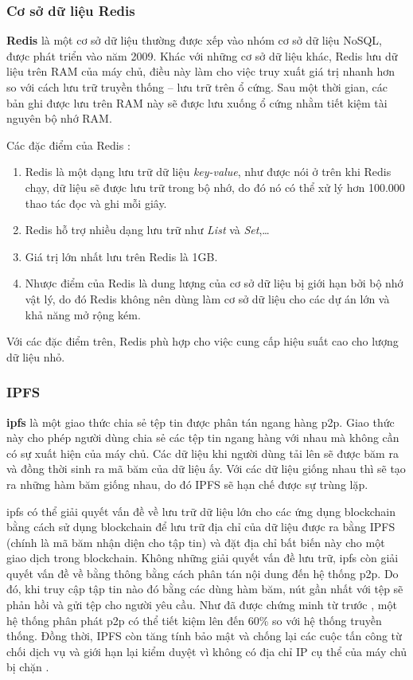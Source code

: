 \documentclass[../main-report.tex]{subfiles}
\begin{document}
\subsubsection{Cơ sở dữ liệu Redis}
\textbf{Redis} là một cơ sở dữ liệu thường được xếp vào nhóm cơ sở dữ liệu NoSQL, được phát triển vào năm 2009. Khác với những cơ sở dữ liệu khác, Redis lưu dữ liệu trên RAM của máy chủ, điều này làm cho việc truy xuất giá trị nhanh hơn so với cách lưu trữ truyền thống – lưu trữ trên ổ cứng. Sau một thời gian, các bản ghi được lưu trên RAM này sẽ được lưu xuống ổ cứng nhằm tiết kiệm tài nguyên bộ nhớ RAM.

Các đặc điểm của Redis \cite{6106531}:

\begin{enumerate}[label=(\roman*)]
\item Redis là một dạng lưu trữ dữ liệu \textit{key-value}, như được nói ở trên khi Redis chạy, dữ liệu sẽ được lưu trữ trong bộ nhớ, do đó nó có thể xử lý hơn 100.000 thao tác đọc và ghi mỗi giây.
\item Redis hỗ trợ nhiều dạng lưu trữ như \textit{List} và \textit{Set},\ldots
\item Giá trị lớn nhất lưu trên Redis là 1GB.
\item Nhược điểm của Redis là dung lượng của cơ sở dữ liệu bị giới hạn bởi bộ nhớ vật lý, do đó Redis không nên dùng làm cơ sở dữ liệu cho các dự án lớn và khả năng mở rộng kém.
\end{enumerate}

Với các đặc điểm trên, Redis phù hợp cho việc cung cấp hiệu suất cao cho lượng dữ liệu nhỏ.

\subsubsection{IPFS}
\textbf{\acrfull{ipfs}} là một giao thức chia sẻ tệp tin được phân tán ngang hàng \acrfull{p2p}. Giao thức này cho phép người dùng chia sẻ các tệp tin ngang hàng với nhau mà không cần có sự xuất hiện của máy chủ. Các dữ liệu khi người dùng tải lên sẽ được băm ra và đồng thời sinh ra mã băm của dữ liệu ấy. Với các dữ liệu giống nhau thì sẽ tạo ra những hàm băm giống nhau, do đó IPFS sẽ hạn chế được sự trùng lặp.
 
\acrshort{ipfs} có thể giải quyết vấn đề về lưu trữ dữ liệu lớn cho các ứng dụng \gls{blockchain} bằng cách sử dụng blockchain để lưu trữ địa chỉ của dữ liệu được ra bằng IPFS (chính là mã băm nhận diện cho tập tin) và đặt địa chỉ bất biến này cho một giao dịch trong blockchain. Không những giải quyết vấn đề lưu trữ, \acrshort{ipfs} còn giải quyết vấn đề về bằng thông bằng cách phân tán nội dung đến hệ thống \acrshort{p2p}. Do đó, khi truy cập tập tin nào đó bằng các dùng hàm băm, nút gần nhất với tệp sẽ phản hồi và gửi tệp cho người yêu cầu. Như đã được chứng minh từ trước \cite{5235364}, một hệ thống phân phát \acrshort{p2p} có thể tiết kiệm lên đến 60\% so với hệ thống truyền thống. Đồng thời, IPFS còn tăng tính bảo mật và chống lại các cuộc tấn công từ chối dịch vụ và giới hạn lại kiểm duyệt vì không có địa chỉ IP cụ thể của máy chủ bị chặn \cite{8441990}.
\end{document}
